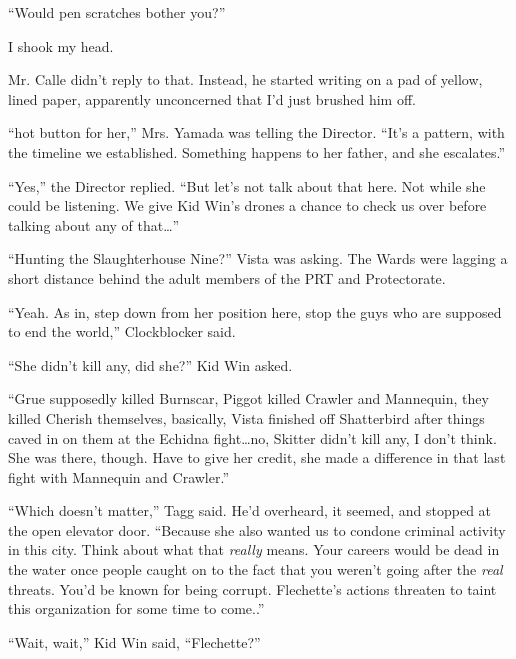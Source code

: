 ``Would pen scratches bother you?''



I shook my head.



Mr. Calle didn't reply to that.  Instead, he started writing on a pad of yellow, lined paper, apparently unconcerned that I'd just brushed him off.



``\ldotsa hot button for her,'' Mrs. Yamada was telling the Director.  ``It's a pattern, with the timeline we established.  Something happens to her father, and she escalates.''



``Yes,'' the Director replied.  ``But let's not talk about that here.  Not while she could be listening.  We give Kid Win's drones a chance to check us over before talking about any of that\ldots''



``Hunting the Slaughterhouse Nine?'' Vista was asking.  The Wards were lagging a short distance behind the adult members of the PRT and Protectorate.



``Yeah.  As in, step down from her position here, stop the guys who are supposed to end the world,'' Clockblocker said.



``She didn't kill any, did she?'' Kid Win asked.



``Grue supposedly killed Burnscar, Piggot killed Crawler and Mannequin, they killed Cherish themselves, basically, Vista finished off Shatterbird after things caved in on them at the Echidna fight\ldots no, Skitter didn't kill any, I don't think.  She was there, though.  Have to give her credit, she made a difference in that last fight with Mannequin and Crawler.''



``Which doesn't matter,'' Tagg said.  He'd overheard, it seemed, and stopped at the open elevator door.  ``Because she also wanted us to condone criminal activity in this city.  Think about what that \emph{really} means.  Your careers would be dead in the water once people caught on to the fact that you weren't going after the \emph{real }threats.  You'd be known for being corrupt.  Flechette's actions threaten to taint this organization for some time to come..''



``Wait, wait,'' Kid Win said, ``Flechette?''



